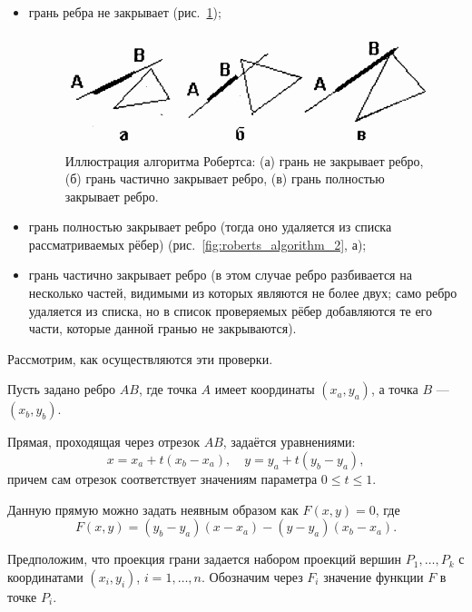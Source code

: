 \begin{itemize}
    \item грань ребра не закрывает (рис.~\ref{fig:roberts_algorithm_1});

\begin{figure}[H]
    \centering
    \includegraphics[width=\textwidth]{img/roberts_algorithm_1.png}
    \caption{Иллюстрация алгоритма Робертса: (а) грань не закрывает ребро, (б) грань частично закрывает ребро, (в) грань полностью закрывает ребро.}
    \label{fig:roberts_algorithm_1}
\end{figure}

	\item грань полностью закрывает ребро (тогда оно удаляется из списка рассматриваемых рёбер) (рис.~\ref{fig:roberts_algorithm_2}, а);
    \item грань частично закрывает ребро (в этом случае ребро разбивается на несколько частей, видимыми из которых являются не более двух; само ребро удаляется из списка, но в список проверяемых рёбер добавляются те его части, которые данной гранью не закрываются).
\end{itemize}

Рассмотрим, как осуществляются эти проверки.

Пусть задано ребро \( AB \), где точка \( A \) имеет координаты \( (x_a, y_a) \), а точка \( B \) --- \( (x_b, y_b) \).

Прямая, проходящая через отрезок \( AB \), задаётся уравнениями:
\begin{equation}
x = x_a + t (x_b - x_a), \quad y = y_a + t (y_b - y_a),
\label{eq:line_equation}
\end{equation}
причем сам отрезок соответствует значениям параметра \( 0 \leq t \leq 1 \).

Данную прямую можно задать неявным образом как \( F(x, y) = 0 \), где
\begin{equation}
F(x, y) = (y_b - y_a)(x - x_a) - (y - y_a)(x_b - x_a).
\label{eq:implicit_line}
\end{equation}

Предположим, что проекция грани задается набором проекций вершин \( P_1, \dots, P_k \) с координатами \( (x_i, y_i) \), \( i = 1, \dots, n \). Обозначим через \( F_i \) значение функции \( F \) в точке \( P_i \).

